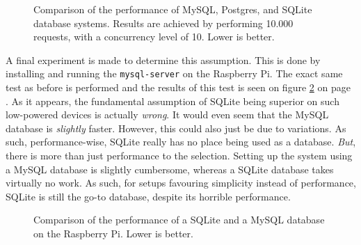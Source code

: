 	\begin{figure}[!h]
		\centering
	    \caption{Comparison of the performance of MySQL, Postgres, and SQLite database systems. Results are achieved by performing 10.000 requests, with a concurrency level of 10. Lower is better.}
	    \label{fig:bench:db}
	\end{figure}

	A final experiment is made to determine this assumption. This is done by installing and running the \verb=mysql-server= on the Raspberry Pi. The exact same test as before is performed and the results of this test is seen on figure \ref{fig:bench:rpi-bench} on page \pageref{fig:bench:rpi-bench}. As it appears, the fundamental assumption of SQLite being superior on such low-powered devices is actually \emph{wrong}. It would even seem that the MySQL database is \emph{slightly} faster. However, this could also just be due to variations. As such, performance-wise, SQLite really has no place being used as a database. \emph{But}, there is more than just performance to the selection. Setting up the system using a MySQL database is slightly cumbersome, whereas a SQLite database takes virtually no work. As such, for setups favouring simplicity instead of performance, SQLite is still the go-to database, despite its horrible performance.

	\begin{figure}[!h]
		\centering
	    \caption{Comparison of the performance of a SQLite and a MySQL database on the Raspberry Pi. Lower is better.}
	    \label{fig:bench:rpi-bench}
	\end{figure}


